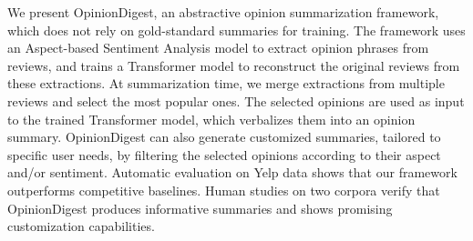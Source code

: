 We present OpinionDigest, an abstractive opinion summarization framework, which does not rely on gold-standard summaries for training. The framework uses an Aspect-based Sentiment Analysis model to extract opinion phrases from reviews, and trains a Transformer model to reconstruct the original reviews from these extractions. At summarization time, we merge extractions from multiple reviews and select the most popular ones. The selected opinions are used as input to the trained Transformer model, which verbalizes them into an opinion summary. OpinionDigest can also generate customized summaries, tailored to specific user needs, by filtering the selected opinions according to their aspect and/or sentiment. Automatic evaluation on Yelp data shows that our framework outperforms competitive baselines. Human studies on two corpora verify that OpinionDigest produces informative summaries and shows promising customization capabilities.
